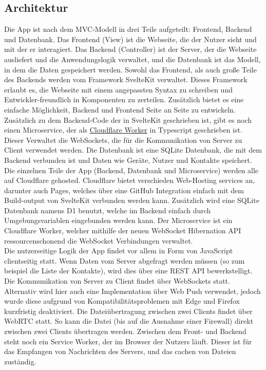 \documentclass[a4paper]{article}
\begin{document}
\subsection{Architektur}
Die App ist nach dem MVC-Modell in drei Teile aufgeteilt: Frontend, Backend und
Datenbank. Das Frontend (View) ist die Webseite, die der Nutzer sieht und mit
der er interagiert. Das Backend (Controller) ist der Server, der die Webseite
ausliefert und die Anwendungslogik verwaltet, und die Datenbank ist das Modell,
in dem die Daten gespeichert werden. Sowohl das Frontend, als auch große Teile
des Backends werden vom Framework SvelteKit verwaltet. Dieses Framework erlaubt
es, die Webseite mit einem angepassten Syntax zu schreiben und
Entwickler-freundlich in Komponenten zu zerteilen. Zusätzlich bietet es eine
einfache Möglichkeit, Backend und Frontend Seite an Seite zu entwickeln.
Zusätzlich zu dem Backend-Code der in SvelteKit geschrieben ist, gibt es noch
einen Microservice, der als \href{https://workers.cloudflare.com/}{Cloudflare
Worker} in Typescript geschrieben ist. Dieser Verwaltet die WebSockets, die für
die Kommunikation von Server zu Client verwendet werden. Die Datenbank ist eine
SQLite Datenbank, die mit dem Backend verbunden ist und Daten wie Geräte, Nutzer
und Kontakte speichert.\\
Die einzelnen Teile der App (Backend, Datenbank und Microservice) werden alle
auf Cloudflare gehosted. Cloudflare bietet verschieden Web-Hosting services an,
darunter auch Pages, welches über eine GitHub Integration einfach mit dem
Build-output von SvelteKit verbunden werden kann. Zusätzlich wird eine SQLite
Datenbank namens D1 benutzt, welche im Backend einfach durch Umgebungsvariablen
eingebunden werden kann. Der Microservice ist ein Cloudflare Worker, welcher
mithilfe der neuen WebSocket Hibernation API ressourcenschonend die WebSocket
Verbindungen verwaltet.\\
Die nutzerseitige Logik der App findet vor allem in Form von JavaScript
clientseitig statt. Wenn Daten vom Server abgefragt werden müssen (so zum
beispiel die Liste der Kontakte), wird dies über eine REST API bewerkstelligt.
Die Kommunikation von Server zu Client findet über WebSockets statt. Alternativ
wird hier auch eine Implementation über Web Push verwendet, jedoch wurde diese
aufgrund von Kompatibilitätsproblemen mit Edge und Firefox kurzfristig
deaktiviert. Die Dateiübertragung zwischen zwei Clients findet über WebRTC
statt. So kann die Datei (bis auf die Ausnahme einer Firewall) direkt zwischen
zwei Clients übertragen werden. Zwischen dem Front- und Backend steht noch ein
Service Worker, der im Browser der Nutzers läuft. Dieser ist für das Empfangen
von Nachrichten des Servers, und das cachen von Dateien zuständig.
\end{document}
